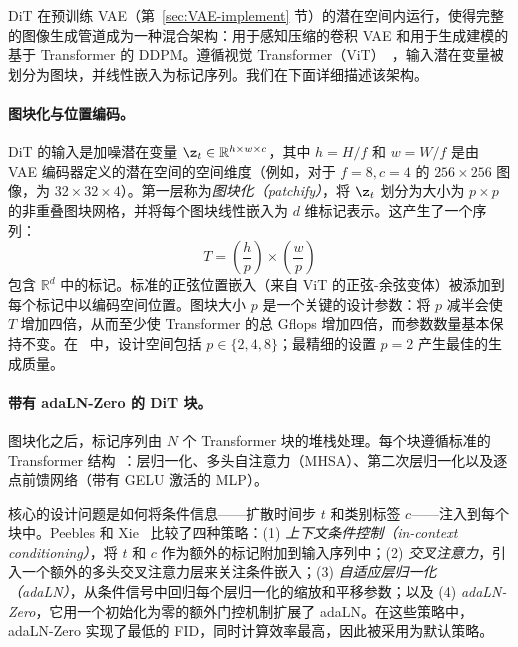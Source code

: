 \documentclass[../../book-main_zh.tex]{subfiles}
\begin{document}
DiT 在预训练 VAE（第~\ref{sec:VAE-implement} 节）的潜在空间内运行，使得完整的图像生成管道成为一种混合架构：用于感知压缩的卷积 VAE 和用于生成建模的基于 Transformer 的 DDPM。遵循视觉 Transformer（ViT）~\citep{dosovitskiy2020image}，输入潜在变量被划分为图块，并线性嵌入为标记序列。我们在下面详细描述该架构。

\paragraph{图块化与位置编码。}
DiT 的输入是加噪潜在变量 $\z_t \in \mathbb{R}^{h \times w \times c}$，其中 $h = H/f$ 和 $w = W/f$ 是由 VAE 编码器定义的潜在空间的空间维度（例如，对于 $f = 8, c = 4$ 的 $256 \times 256$ 图像，为 $32 \times 32 \times 4$）。第一层称为\emph{图块化（patchify）}，将 $\z_t$ 划分为大小为 $p \times p$ 的非重叠图块网格，并将每个图块线性嵌入为 $d$ 维标记表示。这产生了一个序列：
\begin{equation}
    T = \left(\frac{h}{p}\right) \times \left(\frac{w}{p}\right)
\end{equation}
包含 $\mathbb{R}^d$ 中的标记。标准的正弦位置嵌入（来自 ViT 的正弦-余弦变体）被添加到每个标记中以编码空间位置。图块大小 $p$ 是一个关键的设计参数：将 $p$ 减半会使 $T$ 增加四倍，从而至少使 Transformer 的总 Gflops 增加四倍，而参数数量基本保持不变。在~\citep{peebles2023scalable} 中，设计空间包括 $p \in \{2, 4, 8\}$；最精细的设置 $p = 2$ 产生最佳的生成质量。

\paragraph{带有 adaLN-Zero 的 DiT 块。}
图块化之后，标记序列由 $N$ 个 Transformer 块的堆栈处理。每个块遵循标准的 Transformer 结构~\citep{vaswani2017attention}：层归一化、多头自注意力（MHSA）、第二次层归一化以及逐点前馈网络（带有 GELU 激活的 MLP）。

核心的设计问题是如何将条件信息——扩散时间步 $t$ 和类别标签 $c$——注入到每个块中。Peebles 和 Xie~\citep{peebles2023scalable} 比较了四种策略：(1) \emph{上下文条件控制（in-context conditioning）}，将 $t$ 和 $c$ 作为额外的标记附加到输入序列中；(2) \emph{交叉注意力}，引入一个额外的多头交叉注意力层来关注条件嵌入；(3) \emph{自适应层归一化（adaLN）}，从条件信号中回归每个层归一化的缩放和平移参数；以及 (4) \emph{adaLN-Zero}，它用一个初始化为零的额外门控机制扩展了 adaLN。在这些策略中，adaLN-Zero 实现了最低的 FID，同时计算效率最高，因此被采用为默认策略。
\end{document}
